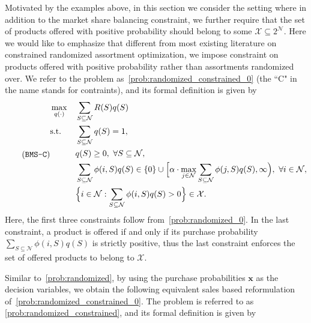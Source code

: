 \documentclass[mnsc,non-blindrev]{informs3}
\theoremstyle{definition}
\begin{document}
Motivated by the examples above, in this section we consider the setting where in addition to the market share balancing constraint, we further require that the set of products offered with positive probability should belong to some $\mathcal{X}\subseteq 2^{\mathcal{N}}$. Here we would like to emphasize that different from most existing literature on constrained randomized assortment optimization, we impose constraint on products offered with positive probability rather than assortments randomized over. We refer to the problem as~\ref{prob:randomized_constrained_0} (the ``C" in the name stands for contraints), and its formal definition is given by
\begin{equation}
\label{prob:randomized_constrained_0}
\tag{\texttt{BMS-C}}
\begin{aligned}
&\max_{q(\cdot)} && \sum_{S\subseteq\mathcal{N}}R(S)q(S)\\
&\textup{s.t.} && \sum_{S\subseteq\mathcal{N}}q(S)=1,\\
&&&q(S)\geq 0,\ \forall S\subseteq\mathcal{N},\\
&&&\sum_{S\subseteq\mathcal{N}}\phi(i,S)q(S)\in\{0\}\cup\Big[\alpha\cdot\max_{j\in\mathcal{N}}\sum_{S\subseteq\mathcal{N}}\phi(j,S)q(S),\infty\Big),\ \forall i\in\mathcal{N},\\
&&&\Big\{i\in\mathcal{N}:\sum_{S\subseteq\mathcal{N}}\phi(i,S)q(S)>0\Big\}\in\mathcal{X}.
\end{aligned}
\end{equation}
Here, the first three constraints follow from~\ref{prob:randomized_0}. In the last constraint, a product is offered if and only if its purchase probability $\sum_{S\subseteq\mathcal{N}}\phi(i,S)q(S)$ is strictly positive, thus the last constraint enforces the set of offered products to belong to $\mathcal{X}$.

Similar to~\ref{prob:randomized}, by using the purchase probabilities $\bm{x}$ as the decision variables, we obtain the following equivalent sales based reformulation of~\ref{prob:randomized_constrained_0}. The problem is referred to as \ref{prob:randomized_constrained}, and its formal definition is given by
\end{document}
